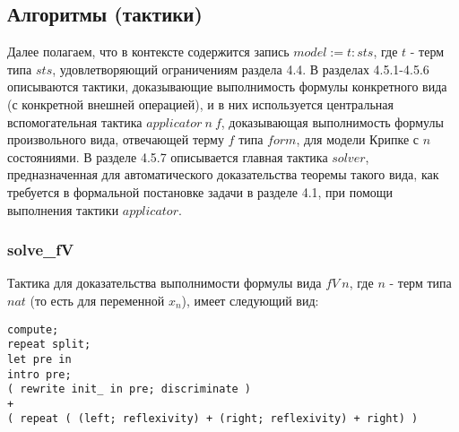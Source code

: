 \documentclass[12pt]{article}
\begin{document}

\subsection{Алгоритмы (тактики)}
Далее полагаем, что в контексте содержится запись $model:=t:sts$, где $t$ - терм типа $sts$, удовлетворяющий ограничениям раздела 4.4.
В разделах 4.5.1-4.5.6 описываются тактики, доказывающие выполнимость формулы конкретного вида (с конкретной внешней операцией), и в них используется центральная вспомогательная тактика $applicator\ n\ f$, доказывающая выполнимость формулы произвольного вида, отвечающей терму $f$ типа $form$, для модели Крипке с $n$ состояниями. 
В разделе 4.5.7 описывается главная тактика $solver$, предназначенная для автоматического доказательства теоремы такого вида, как требуется в формальной постановке задачи в разделе 4.1, при помощи выполнения тактики $applicator$.


\subsubsection{solve\_fV}

Тактика для доказательства выполнимости формулы вида $fV\ n$, где $n$ - терм типа $nat$ (то есть для переменной $x_n$), имеет следующий вид:
\begin{verbatim}
compute;
repeat split;
let pre in
intro pre;
( rewrite init_ in pre; discriminate ) 
+
( repeat ( (left; reflexivity) + (right; reflexivity) + right) )
\end{verbatim}
\end{document}
